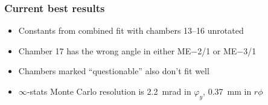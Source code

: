 \documentclass[compress]{beamer}
\begin{document}
\begin{frame}
\frametitle{Current best results}
\small
\begin{itemize}
\item Constants from combined fit with chambers 13--16 unrotated
\item Chamber 17 has the wrong angle in either ME$-$2/1 or ME$-$3/1
\item Chambers marked ``questionable'' also don't fit well
\item $\infty$-stats Monte Carlo resolution is 2.2~mrad in $\varphi_y$, 0.37~mm in $r\phi$
\end{itemize}

\begin{center}

\end{center}
\end{frame}
\end{document}
